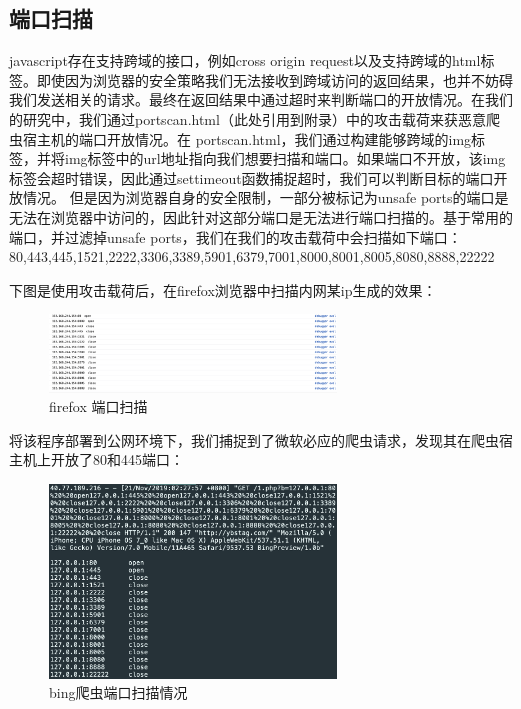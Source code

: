 \documentclass[doctor,privacy,twoside]{buaa_mac}
\begin{document}
\subsection{端口扫描}
javascript存在支持跨域的接口，例如cross origin request以及支持跨域的html标签。即使因为浏览器的安全策略我们无法接收到跨域访问的返回结果，也并不妨碍我们发送相关的请求。最终在返回结果中通过超时来判断端口的开放情况。在我们的研究中，我们通过portscan.html（此处引用到附录）中的攻击载荷来获恶意爬虫宿主机的端口开放情况。在
portscan.html，我们通过构建能够跨域的img标签，并将img标签中的url地址指向我们想要扫描和端口。如果端口不开放，该img标签会超时错误，因此通过settimeout函数捕捉超时，我们可以判断目标的端口开放情况。
但是因为浏览器自身的安全限制，一部分被标记为unsafe ports的端口是无法在浏览器中访问的，因此针对这部分端口是无法进行端口扫描的。基于常用的端口，并过滤掉unsafe ports，我们在我们的攻击载荷中会扫描如下端口：80,443,445,1521,2222,3306,3389,5901,6379,7001,8000,8001,8005,8080,8888,22222

下图是使用攻击载荷后，在firefox浏览器中扫描内网某ip生成的效果：
\centerline{}
\begin{figure}[!h]
  \centering
  \includegraphics[width=0.68\textwidth]{images/portscan.png}
  \caption{firefox 端口扫描}
  \label{fig:logo}
\end{figure}
\centerline{}

将该程序部署到公网环境下，我们捕捉到了微软必应的爬虫请求，发现其在爬虫宿主机上开放了80和445端口：
\centerline{}
\begin{figure}[!h]
  \centering
  \includegraphics[width=0.68\textwidth]{images/bing_crawler_portscan.png}
  \caption{bing爬虫端口扫描情况}
  \label{fig:logo}
\end{figure}
\centerline{}
\end{document}
